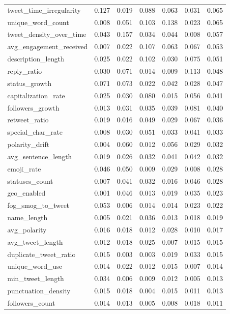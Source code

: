 \begin{tabular}{lrrrrrr}
tweet_time_irregularity & 0.127 & 0.019 & 0.088 & 0.063 & 0.031 & 0.065 \\
unique_word_count & 0.008 & 0.051 & 0.103 & 0.138 & 0.023 & 0.065 \\
tweet_density_over_time & 0.043 & 0.157 & 0.034 & 0.044 & 0.008 & 0.057 \\
avg_engagement_received & 0.007 & 0.022 & 0.107 & 0.063 & 0.067 & 0.053 \\
description_length & 0.025 & 0.022 & 0.102 & 0.030 & 0.075 & 0.051 \\
reply_ratio & 0.030 & 0.071 & 0.014 & 0.009 & 0.113 & 0.048 \\
status_growth & 0.071 & 0.073 & 0.022 & 0.042 & 0.028 & 0.047 \\
capitalization_rate & 0.025 & 0.030 & 0.080 & 0.015 & 0.056 & 0.041 \\
followers_growth & 0.013 & 0.031 & 0.035 & 0.039 & 0.081 & 0.040 \\
retweet_ratio & 0.019 & 0.016 & 0.049 & 0.029 & 0.067 & 0.036 \\
special_char_rate & 0.008 & 0.030 & 0.051 & 0.033 & 0.041 & 0.033 \\
polarity_drift & 0.004 & 0.060 & 0.012 & 0.056 & 0.029 & 0.032 \\
avg_sentence_length & 0.019 & 0.026 & 0.032 & 0.041 & 0.042 & 0.032 \\
emoji_rate & 0.046 & 0.050 & 0.009 & 0.029 & 0.008 & 0.028 \\
statuses_count & 0.007 & 0.041 & 0.032 & 0.016 & 0.046 & 0.028 \\
geo_enabled & 0.001 & 0.046 & 0.013 & 0.019 & 0.035 & 0.023 \\
fog_smog_to_tweet & 0.053 & 0.006 & 0.014 & 0.014 & 0.023 & 0.022 \\
name_length & 0.005 & 0.021 & 0.036 & 0.013 & 0.018 & 0.019 \\
avg_polarity & 0.016 & 0.018 & 0.012 & 0.028 & 0.010 & 0.017 \\
avg_tweet_length & 0.012 & 0.018 & 0.025 & 0.007 & 0.015 & 0.015 \\
duplicate_tweet_ratio & 0.015 & 0.003 & 0.003 & 0.019 & 0.033 & 0.015 \\
unique_word_use & 0.014 & 0.022 & 0.012 & 0.015 & 0.007 & 0.014 \\
min_tweet_length & 0.034 & 0.006 & 0.009 & 0.012 & 0.005 & 0.013 \\
punctuation_density & 0.015 & 0.018 & 0.004 & 0.015 & 0.011 & 0.013 \\
followers_count & 0.014 & 0.013 & 0.005 & 0.008 & 0.018 & 0.011 \\

\end{tabular}
